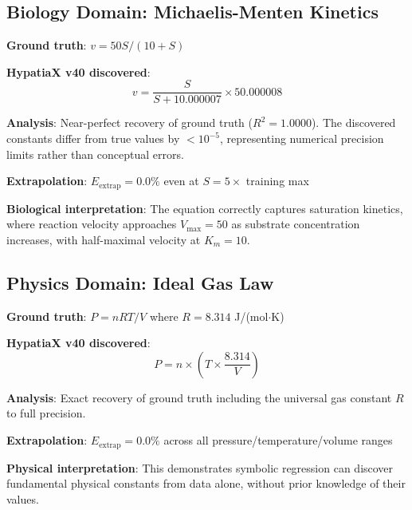 \documentclass[twoside,11pt]{article}
\begin{document}
\subsection{Biology Domain: Michaelis-Menten Kinetics}

\begin{example}
\textbf{Ground truth}: $v = 50S/(10 + S)$

\textbf{HypatiaX v40 discovered}:
\begin{equation}
v = \frac{S}{S + 10.000007} \times 50.000008
\end{equation}

\textbf{Analysis}: Near-perfect recovery of ground truth ($R^2 = 1.0000$). The discovered constants differ from true values by $<10^{-5}$, representing numerical precision limits rather than conceptual errors.

\textbf{Extrapolation}: $E_{\text{extrap}} = 0.0\%$ even at $S = 5\times$ training max

\textbf{Biological interpretation}: The equation correctly captures saturation kinetics, where reaction velocity approaches $V_{\max} = 50$ as substrate concentration increases, with half-maximal velocity at $K_m = 10$.
\end{example}

\subsection{Physics Domain: Ideal Gas Law}

\begin{example}
\textbf{Ground truth}: $P = nRT/V$ where $R = 8.314$ J/(mol$\cdot$K)

\textbf{HypatiaX v40 discovered}:
\begin{equation}
P = n \times \left(T \times \frac{8.314}{V}\right)
\end{equation}

\textbf{Analysis}: Exact recovery of ground truth including the universal gas constant $R$ to full precision.

\textbf{Extrapolation}: $E_{\text{extrap}} = 0.0\%$ across all pressure/temperature/volume ranges

\textbf{Physical interpretation}: This demonstrates symbolic regression can discover fundamental physical constants from data alone, without prior knowledge of their values\citep{la2021contemporary}.
\end{example}
\end{document}

